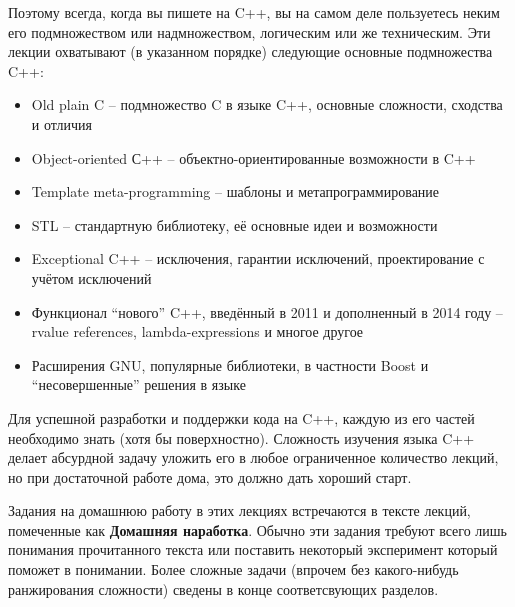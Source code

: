 \documentclass[a4paper,12pt,oneside]{article}
\begin{document}
Поэтому всегда, когда вы пишете на C++, вы на самом деле пользуетесь неким его подмножеством или надмножеством, логическим или же техническим. Эти лекции охватывают (в указанном порядке) следующие основные подмножества C++:

\begin{itemize}
\item
Old plain C – подмножество C в языке C++, основные сложности, сходства и отличия
\item
Object-oriented С++ – объектно-ориентированные возможности в C++
\item
Template meta-programming – шаблоны и метапрограммирование
\item
STL – стандартную библиотеку, её основные идеи и возможности
\item
Exceptional C++ – исключения, гарантии исключений, проектирование с учётом исключений
\item
Функционал ``нового'' C++, введённый в 2011 и дополненный в 2014 году -- rvalue references, lambda-expressions и многое другое
\item
Расширения GNU, популярные библиотеки, в частности Boost и ``несовершенные'' решения в языке
\end{itemize}

Для успешной разработки и поддержки кода на C++, каждую из его частей необходимо знать (хотя бы поверхностно). Сложность изучения языка C++ делает абсурдной задачу уложить его в любое ограниченное количество лекций, но при достаточной работе дома, это должно дать хороший старт.

Задания на домашнюю работу в этих лекциях встречаются в тексте лекций, помеченные как \textbf{Домашняя наработка}. Обычно эти задания требуют всего лишь понимания прочитанного текста или поставить некоторый эксперимент который поможет в понимании. Более сложные задачи (впрочем без какого-нибудь ранжирования сложности) сведены в конце соответсвующих разделов.

\pagebreak
\end{document}
